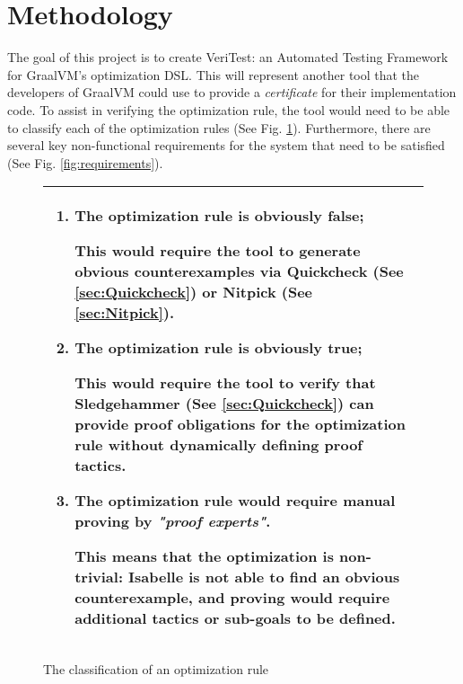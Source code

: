 \section{Methodology}
\label{sec:Methodology}

The goal of this project is to create VeriTest: an Automated Testing Framework for GraalVM's optimization DSL. This will represent another 
tool that the developers of GraalVM could use to provide a \emph{certificate} for their implementation code. To assist in verifying the 
optimization rule, the tool would need to be able to classify each of the optimization rules (See Fig. \ref{fig:classification}). Furthermore, 
there are several key non-functional requirements for the system that need to be satisfied (See Fig. \ref{fig:requirements}).

\begin{figure}[h]
      \begin{tabular}{|L{0.95\textwidth}|}
            \hline
            \begin{enumerate}
                  \item The optimization rule is obviously false;
                  
                        This would require the tool to generate obvious counterexamples via Quickcheck (See \ref{sec:Quickcheck}) or Nitpick 
                        (See \ref{sec:Nitpick}).
              
                  \item The optimization rule is obviously true;
                  
                        This would require the tool to verify that Sledgehammer (See \ref{sec:Quickcheck}) can provide proof obligations for the 
                        optimization rule \textbf{without} dynamically defining proof tactics.
              
                  \item The optimization rule would require manual proving by \emph{"proof experts"}.
                        
                        This means that the optimization is non-trivial: Isabelle is not able to find an obvious counterexample, and proving would require 
                        additional tactics or sub-goals to be defined.
            \end{enumerate} \\
            \hline
      \end{tabular}
      \caption{The classification of an optimization rule}
      \label{fig:classification}
\end{figure}


